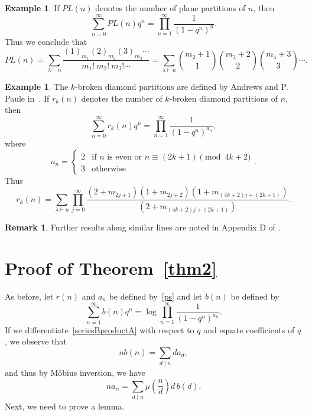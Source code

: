 \documentclass[10pt]{article}
\theoremstyle{definition}
\newtheorem{example}[theorem]{Example}
\newtheorem*{remark}{Remark}
\numberwithin{theorem}{section}
\numberwithin{equation}{section}
\begin{document}
\begin{example}
If $PL(n)$ denotes the number of plane partitions of $n$, then 
\begin{equation} \label{PLGF}
\sum_{n=0}^\infty PL(n) q^n =\prod_{n=1}^\infty \frac{1}{(1-q^n)^{n}}.
\end{equation}
  Thus we conclude that
\begin{equation}
PL(n) =  \sum_{\lambda\vdash n} \frac{(1)_{m_1} (2)_{m_2} (3)_{m_3} \cdots}
{m_1!\ m_2! \ m_3! \cdots} 
=  \sum_{\lambda\vdash n} \binom{m_2+1}{1} \binom{m_3+2}{2} \binom{m_4+3}{3} \cdots.
\end{equation}
\end{example}

\begin{example}
The $k$-broken diamond partitions
are defined by Andrews and P. Paule in~\cite{ap07}.   If $r_k(n)$ denotes the number of
$k$-broken diamond partitions of $n$, then
\[ \sum_{n=0}^\infty r_k(n) q^n = \prod_{n=1}^\infty \frac{1}{(1-q^n)^{a_n}}, \]
where
\[ a_n = 
\begin{cases}  
  2 &\mbox{if $n$ is even or $n\equiv (2k+1)\pmod{4k+2}$} \\
  3 &\mbox{otherwise}
\end{cases} .
\]
Thus
\begin{equation}
r_k(n) 
=\sum_{\lambda\vdash n}
\prod_{j=0}^\infty  \frac{ (2+m_{2j+1}) (1+m_{2j+2})  (1+m_{(4k+2)j+(2k+1)}) }
 {   {(2+m_{(4k+2)j+(2k+1)})}  } .
\end{equation}

\begin{remark} Further results along similar lines are noted in Appendix D of \cite{Schneider_PhD}.\end{remark}
\end{example}
  
  \section{Proof of Theorem~\ref{thm2}}
  As before, let $r(n)$ and $a_n$ be defined by~\eqref{ps} and let $b(n)$ be defined by
  \begin{equation}  \label{seriesBproductA}
      \sum_{n=1}^\infty b(n) q^n = \log \prod_{n=1}^\infty \frac{1}{(1-q^n)^{a_n}}.
  \end{equation}
If we differentiate~\eqref{seriesBproductA} with respect to $q$ and equate coefficients of
$q$, we observe that
\begin{equation}
     n b( n ) = \sum_{d\mid n} d  a_d,
\end{equation}  and thus by M\"obius inversion, we have
\begin{equation}
\label{AfromB}
   n a_n = \sum_{d\mid n} \mu\left( \frac nd\right) d\,b(d) .
\end{equation}
 Next, we need to prove a lemma.
\end{document}
